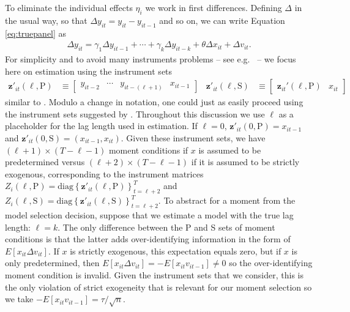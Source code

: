 To eliminate the individual effects $\eta_i$ we work in first differences.
Defining $\Delta$ in the usual way, so that $\Delta y_{it} = y_{it} - y_{it-1}$ and so on, we can write Equation \ref{eq:truepanel} as
\begin{align}
  \Delta y_{it} = \gamma_1 \Delta y_{it-1} + \cdots + \gamma_k \Delta y_{it-k} + \theta \Delta x_{it} + \Delta v_{it}.
  \label{eq:truepaneldiff}
\end{align}
For simplicity and to avoid many instruments problems -- see e.g.\ \cite{Roodman} -- we focus here on estimation using the instrument sets
\begin{align}
  \mathbf{z}'_{it}(\ell, \text{P}) &\equiv \left[
  \begin{array}{cccc}
    y_{it-2} & \cdots & y_{it-(\ell + 1)} & x_{it-1}
  \end{array}
\right] & 
\mathbf{z}'_{it}(\ell,\text{S}) &\equiv \left[
\begin{array}{cc}
  \mathbf{z}_{it}'(\ell,\text{P}) & x_{it}
\end{array}
\right]
\label{eq:Zdpanel}
\end{align}
similar to \cite{AndersonHsiao}.
Modulo a change in notation, one could just as easily proceed using the instrument sets suggested by \cite{ArellanoBond}.
Throughout this discussion we use $\ell$ as a placeholder for the lag length used in estimation.
If $\ell = 0$, $\mathbf{z}'_{it}(0,\text{P}) = x_{it-1}$ and $\mathbf{z}'_{it}(0,\text{S}) = (x_{it-1}, x_{it})$.
Given these instrument sets, we have $(\ell + 1)\times (T -\ell - 1)$ moment conditions if $x$ is assumed to be predetermined versus $(\ell + 2)\times (T - \ell - 1)$ if it is assumed to be strictly exogenous, corresponding to the instrument matrices
  $Z_i(\ell,\text{P}) = \mbox{diag}\left\{ \mathbf{z}'_{it}(\ell,\text{P})  \right\}_{t = \ell + 2}^T$ and  $Z_i(\ell,\text{S}) = \mbox{diag}\left\{\mathbf{z}'_{it}(\ell,\text{S}) \right\}_{t = \ell +2}^T$.
To abstract for a moment from the model selection decision, suppose that we estimate a model with the true lag length: $\ell = k$.
The only difference between the P and S sets of moment conditions is that the latter adds over-identifying information in the form of $E[x_{it}\Delta v_{it}]$.
If $x$ is strictly exogenous, this expectation equals zero, but if $x$ is only predetermined, then $E[x_{it}\Delta v_{it}] = -E[x_{it}v_{it-1}] \neq 0$ so the over-identifying moment condition is invalid.
Given the instrument sets that we consider, this is the only violation of strict exogeneity that is relevant for our moment selection so we take $-E[x_{it}v_{it-1}] = \tau/\sqrt{n}$.

